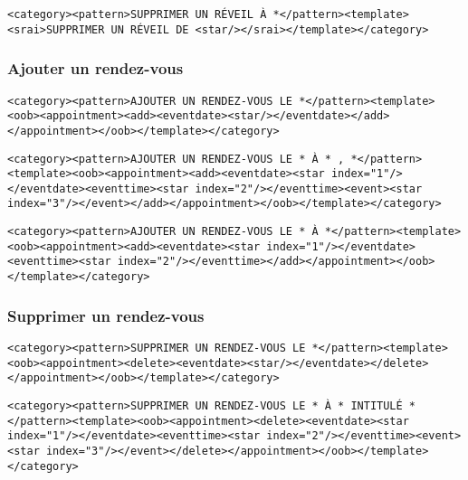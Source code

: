 \begin{lstlisting}[frame=none,aboveskip=0.5em]
<category><pattern>SUPPRIMER UN RÉVEIL À *</pattern><template><srai>SUPPRIMER UN RÉVEIL DE <star/></srai></template></category>
\end{lstlisting}

\subsubsection{Ajouter un rendez-vous}
\begin{lstlisting}[frame=none,aboveskip=0.5em]
<category><pattern>AJOUTER UN RENDEZ-VOUS LE *</pattern><template><oob><appointment><add><eventdate><star/></eventdate></add></appointment></oob></template></category>
\end{lstlisting}

\begin{lstlisting}[frame=none,aboveskip=0.5em]
<category><pattern>AJOUTER UN RENDEZ-VOUS LE * À * , *</pattern><template><oob><appointment><add><eventdate><star index="1"/></eventdate><eventtime><star index="2"/></eventtime><event><star index="3"/></event></add></appointment></oob></template></category>
\end{lstlisting}

\begin{lstlisting}[frame=none,aboveskip=0.5em]
<category><pattern>AJOUTER UN RENDEZ-VOUS LE * À *</pattern><template><oob><appointment><add><eventdate><star index="1"/></eventdate><eventtime><star index="2"/></eventtime></add></appointment></oob></template></category>
\end{lstlisting}

\subsubsection{Supprimer un rendez-vous}
\begin{lstlisting}[frame=none,aboveskip=0.5em]
<category><pattern>SUPPRIMER UN RENDEZ-VOUS LE *</pattern><template><oob><appointment><delete><eventdate><star/></eventdate></delete></appointment></oob></template></category>
\end{lstlisting}

\begin{lstlisting}[frame=none,aboveskip=0.5em]
<category><pattern>SUPPRIMER UN RENDEZ-VOUS LE * À * INTITULÉ *</pattern><template><oob><appointment><delete><eventdate><star index="1"/></eventdate><eventtime><star index="2"/></eventtime><event><star index="3"/></event></delete></appointment></oob></template></category>
\end{lstlisting}

